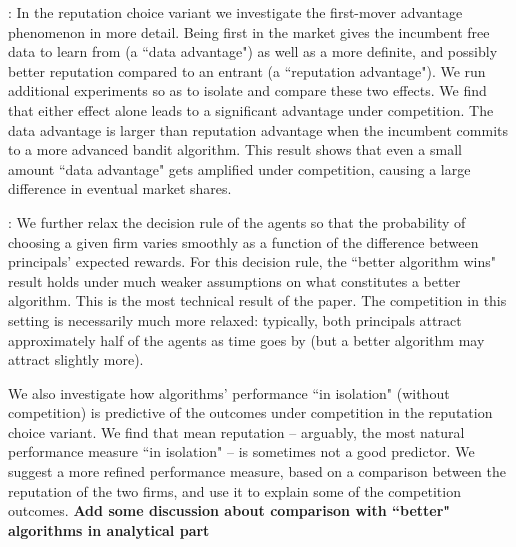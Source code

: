 
: In the reputation choice variant we investigate the first-mover advantage phenomenon in more detail. Being first in the market gives the incumbent free data to learn from (a ``data advantage") as well as a more definite, and possibly better reputation compared to an entrant (a ``reputation advantage"). We run additional experiments so as to isolate and compare these two effects. We find that either effect alone leads to a significant advantage under competition. The data advantage is larger than reputation advantage when the incumbent commits to a more advanced bandit algorithm. This result shows that even a small amount ``data advantage" gets amplified under competition, causing a large difference in eventual market shares.

: We further relax the decision rule of the agents so that the probability of choosing a given firm varies smoothly as a function of the difference between  principals' expected rewards. For this decision rule, the ``better algorithm wins" result holds under much weaker assumptions on what constitutes a better algorithm. This is the most technical result of the paper. The competition in this setting is necessarily much more relaxed: typically, both principals attract approximately half of the agents as time goes by (but a better algorithm may attract slightly more).

 We also investigate how algorithms' performance ``in isolation" (without competition) is predictive of the outcomes under competition in the reputation choice variant. We find that mean reputation -- arguably, the most natural performance measure ``in isolation" -- is sometimes not a good predictor. We suggest a more refined performance measure, based on a comparison between the reputation of the two firms, and use it to explain some of the competition outcomes.
\textbf{Add some discussion about comparison with ``better" algorithms in analytical part}


